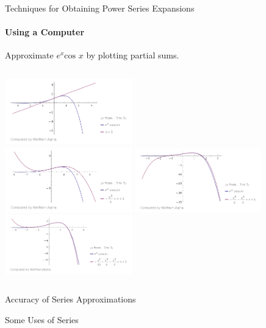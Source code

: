\documentclass{beamer}
\begin{document}
\begin{frame}{Techniques for Obtaining Power Series Expansions}
    	\framesubtitle{Using a Computer}
	Approximate $e^{x}\mbox{cos\ }x$ by plotting partial sums.
    	\begin{columns}[c]
     	\includegraphics[width=5.5cm]{images/PowerSeriesPlot1.png} \\
     	\includegraphics[width=5.5cm]{images/PowerSeriesPlot2.png} 
     	\includegraphics[width=5.5cm]{images/PowerSeriesPlot3.png} \\
     	\includegraphics[width=5.5cm]{images/PowerSeriesPlot4.png} 
    	\end{columns}
\end{frame}
  
\begin{frame}{Accuracy of Series Approximations}
\end{frame}
  
\begin{frame}{Some Uses of Series}
\end{frame}
\end{document}
